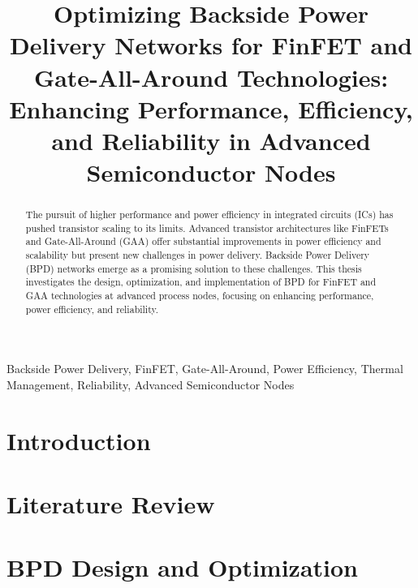 \documentclass[conference]{IEEEtran}
\begin{document}
\title{Optimizing Backside Power Delivery Networks for FinFET and Gate-All-Around Technologies: Enhancing Performance, Efficiency, and Reliability in Advanced Semiconductor Nodes}

\author{
}

\maketitle

\begin{abstract}
The pursuit of higher performance and power efficiency in integrated circuits (ICs) has pushed transistor scaling to its limits. Advanced transistor architectures like FinFETs and Gate-All-Around (GAA) offer substantial improvements in power efficiency and scalability but present new challenges in power delivery. Backside Power Delivery (BPD) networks emerge as a promising solution to these challenges. This thesis investigates the design, optimization, and implementation of BPD for FinFET and GAA technologies at advanced process nodes, focusing on enhancing performance, power efficiency, and reliability.
\end{abstract}

\begin{IEEEkeywords}
Backside Power Delivery, FinFET, Gate-All-Around, Power Efficiency, Thermal Management, Reliability, Advanced Semiconductor Nodes
\end{IEEEkeywords}

\section{Introduction}


\section{Literature Review}


\section{BPD Design and Optimization}

\end{document}
